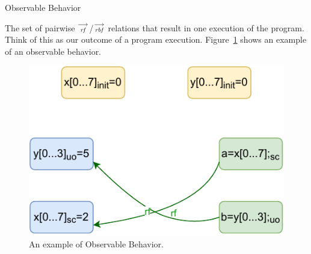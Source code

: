     \begin{definition}{Observable Behavior}
    
        The set of pairwise $\stackrel{\longrightarrow}{_\textit{rf}}$/$\stackrel{\longrightarrow}{_\textit{rbf}}$ relations that result in one execution of the program. Think of this as our outcome of a program execution.
        Figure~\ref{model:observable} shows an example of an observable behavior.
    
        \begin{figure}[H]
            \centering
            \includegraphics[scale=0.7]{4.ECMAScriptMemoryModel/Observables.pdf}
            \caption{An example of Observable Behavior.}
            \label{model:observable}
        \end{figure}
        
    \end{definition}

    